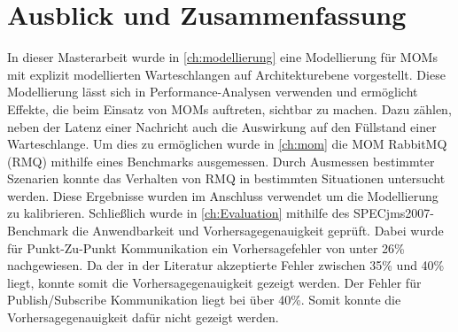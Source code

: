 
\chapter{Ausblick und Zusammenfassung}
\label{ch:zusammenfassung}
In dieser Masterarbeit wurde in \autoref{ch:modellierung} eine Modellierung für MOMs mit explizit modellierten Warteschlangen auf Architekturebene vorgestellt. Diese Modellierung lässt sich in Performance-Analysen verwenden und ermöglicht Effekte, die beim Einsatz von MOMs auftreten, sichtbar zu machen. Dazu zählen, neben der Latenz einer Nachricht auch die Auswirkung auf den Füllstand einer Warteschlange. Um dies zu ermöglichen wurde in \autoref{ch:mom} die MOM RabbitMQ (RMQ) mithilfe eines Benchmarks ausgemessen. Durch Ausmessen bestimmter Szenarien konnte das Verhalten von RMQ in bestimmten Situationen untersucht werden. Diese Ergebnisse wurden im Anschluss verwendet um die Modellierung zu kalibrieren. Schließlich wurde in \autoref{ch:Evaluation} mithilfe des SPECjms2007-Benchmark die Anwendbarkeit und Vorhersagegenauigkeit geprüft. Dabei wurde für Punkt-Zu-Punkt Kommunikation ein Vorhersagefehler von unter 26\% nachgewiesen. Da der in der Literatur akzeptierte Fehler zwischen 35\% und 40\% \cite{error} liegt, konnte somit die Vorhersagegenauigkeit gezeigt werden. Der Fehler für Publish/Subscribe Kommunikation liegt bei über 40\%. Somit konnte die Vorhersagegenauigkeit dafür nicht gezeigt werden.\par
